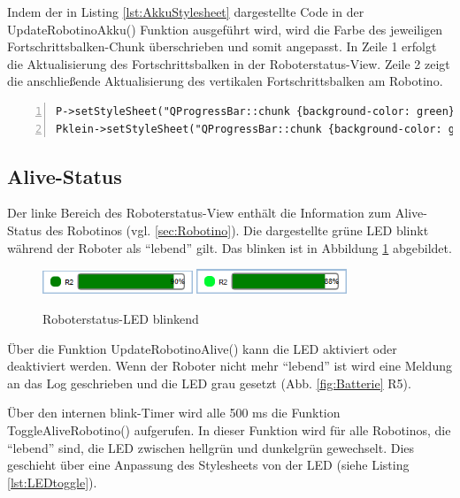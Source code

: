 Indem der in Listing \ref{lst:AkkuStylesheet} dargestellte Code in der UpdateRobotinoAkku() Funktion ausgeführt wird, wird die Farbe des jeweiligen Fortschrittsbalken-Chunk überschrieben und somit angepasst. In Zeile 1 erfolgt die Aktualisierung des Fortschrittsbalken in der Roboterstatus-View. Zeile 2 zeigt die anschließende Aktualisierung des vertikalen Fortschrittsbalken am Robotino. 

\begin{lstlisting}[frame=single, breaklines=true, numbers=left, stepnumber=2, firstnumber=1, numberstyle = \tiny, caption=Stylesheet Aktualisierung der Akku-Progressbar ,label=lst:AkkuStylesheet]
P->setStyleSheet("QProgressBar::chunk {background-color: green}");
Pklein->setStyleSheet("QProgressBar::chunk {background-color: green}");
\end{lstlisting}

\subsection{Alive-Status}

Der linke Bereich des Roboterstatus-View enthält die Information zum Alive-Status des Robotinos (vgl. \ref{sec:Robotino}). Die dargestellte grüne LED blinkt während der Roboter als "`lebend"' gilt. Das blinken ist in Abbildung \ref{fig:Led} abgebildet. 

\begin{figure}[htb]
    \centering
    \includegraphics[width=0.4\textwidth]{Abbildungen/BatterieAlive1.png}
    \includegraphics[width=0.4\textwidth]{Abbildungen/BatterieAlive2.png}
    \caption{Roboterstatus-LED blinkend}		
    \label{fig:Led}
\end{figure}

Über die Funktion UpdateRobotinoAlive() kann die LED aktiviert oder deaktiviert werden. Wenn der Roboter nicht mehr "`lebend"' ist wird eine Meldung an das Log geschrieben und die LED grau gesetzt (Abb. \ref{fig:Batterie} R5). 


Über den internen blink-Timer wird alle 500 ms die Funktion ToggleAliveRobotino() aufgerufen. In dieser Funktion wird für alle Robotinos, die "`lebend"' sind, die LED zwischen hellgrün und dunkelgrün gewechselt. Dies geschieht über eine Anpassung des Stylesheets von der LED (siehe Listing \ref{lst:LEDtoggle}). 

